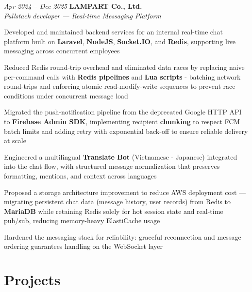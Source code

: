\begin{twocolentry}{\textit{Apr 2024 -- Dec 2025}}
    \textbf{LAMPART Co., Ltd.} \\[4pt]
    \textit{Fullstack developer — Real-time Messaging Platform}
\end{twocolentry}
\begin{onecolentry}
    \begin{highlights}
        \item Developed and maintained backend services for an internal real-time chat platform built on \textbf{Laravel}, \textbf{NodeJS}, \textbf{Socket.IO}, and \textbf{Redis}, supporting live messaging across concurrent employees
        \item Reduced Redis round-trip overhead and eliminated data races by replacing naive per-command calls with \textbf{Redis pipelines} and \textbf{Lua scripts} - batching network round-trips and enforcing atomic read-modify-write sequences to prevent race conditions under concurrent message load
        \item Migrated the push-notification pipeline from the deprecated Google HTTP API to \textbf{Firebase Admin SDK}, implementing recipient \textbf{chunking} to respect FCM batch limits and adding retry with exponential back-off to ensure reliable delivery at scale
        \item Engineered a multilingual \textbf{Translate Bot} (Vietnamese - Japanese) integrated into the chat flow, with structured message normalization that preserves formatting, mentions, and context across languages
        \item Proposed a storage architecture improvement to reduce AWS deployment cost — migrating persistent chat data (message history, user records) from Redis to \textbf{MariaDB} while retaining Redis solely for hot session state and real-time pub/sub, reducing memory-heavy ElastiCache usage
        \item Hardened the messaging stack for reliability: graceful reconnection and message ordering guarantees handling on the WebSocket layer
    \end{highlights}
\end{onecolentry}

\newpage
\section{Projects}

